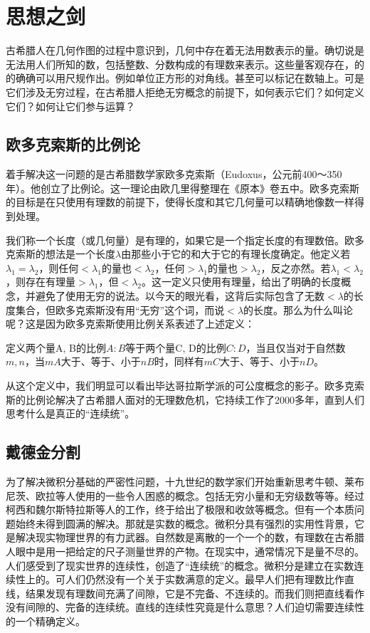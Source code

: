 \documentclass[b5paper]{ctexart}
\begin{document}
\section{思想之剑}

古希腊人在几何作图的过程中意识到，几何中存在着无法用数表示的量。确切说是无法用人们所知的数，包括整数、分数构成的有理数来表示。这些量客观存在，的的确确可以用尺规作出。例如单位正方形的对角线。甚至可以标记在数轴上。可是它们涉及无穷过程，在古希腊人拒绝无穷概念的前提下，如何表示它们？如何定义它们？如何让它们参与运算？

\subsection{欧多克索斯的比例论}

着手解决这一问题的是古希腊数学家欧多克索斯（Eudoxus，公元前400～350年）。他创立了比例论。这一理论由欧几里得整理在《原本》卷五中。欧多克索斯的目标是在只使用有理数的前提下，使得长度和其它几何量可以精确地像数一样得到处理。

我们称一个长度（或几何量）是有理的，如果它是一个指定长度的有理数倍。欧多克索斯的想法是一个长度$\lambda$由那些小于它的和大于它的有理长度确定。他定义若$\lambda_1 = \lambda_2$，则任何$< \lambda_1$的量也$< \lambda_2$，任何$> \lambda_1$的量也$> \lambda_2$，反之亦然。若$\lambda_1 < \lambda_2$，则存在有理量$> \lambda_1$，但$< \lambda_2$。这一定义只使用有理量，给出了明确的长度概念，并避免了使用无穷的说法。以今天的眼光看，这背后实际包含了无数$< \lambda$的长度集合，但欧多克索斯没有用“无穷”这个词，而说$< \lambda$的长度。那么为什么叫论呢？这是因为欧多克索斯使用比例关系表述了上述定义：

\begin{definition}[欧多克索斯]
定义两个量A, B的比例$A:B$等于两个量C, D的比例$C:D$，当且仅当对于自然数$m, n$，当$mA$大于、等于、小于$nB$时，同样有$mC$大于、等于、小于$nD$。
\end{definition}

从这个定义中，我们明显可以看出毕达哥拉斯学派的可公度概念的影子。欧多克索斯的比例论解决了古希腊人面对的无理数危机，它持续工作了2000多年，直到人们思考什么是真正的“连续统”。

\subsection{戴德金分割}

为了解决微积分基础的严密性问题，十九世纪的数学家们开始重新思考牛顿、莱布尼茨、欧拉等人使用的一些令人困惑的概念。包括无穷小量和无穷级数等等。经过柯西和魏尔斯特拉斯等人的工作，终于给出了极限和收敛等概念。但有一个本质问题始终未得到圆满的解决。那就是实数的概念。微积分具有强烈的实用性背景，它是解决现实物理世界的有力武器。自然数是离散的一个一个的数，有理数在古希腊人眼中是用一把给定的尺子测量世界的产物。在现实中，通常情况下是量不尽的。人们感受到了现实世界的连续性，创造了“连续统”的概念。微积分是建立在实数连续性上的。可人们仍然没有一个关于实数满意的定义。最早人们把有理数比作直线，结果发现有理数间充满了间隙，它是不完备、不连续的。而我们则把直线看作没有间隙的、完备的连续统。直线的连续性究竟是什么意思？人们迫切需要连续性的一个精确定义。
\end{document}
